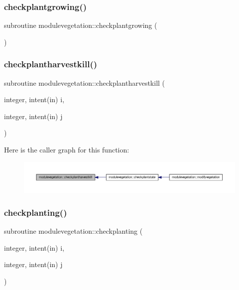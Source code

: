 \subsubsection{\texorpdfstring{checkplantgrowing()}{checkplantgrowing()}}
{\footnotesize\ttfamily subroutine modulevegetation\+::checkplantgrowing (\begin{DoxyParamCaption}{ }\end{DoxyParamCaption})\hspace{0.3cm}{\ttfamily [private]}}

\mbox{\label{namespacemodulevegetation_a3456662ceedeb9f7d5ad12c24dd83bc4}} 
\subsubsection{\texorpdfstring{checkplantharvestkill()}{checkplantharvestkill()}}
{\footnotesize\ttfamily subroutine modulevegetation\+::checkplantharvestkill (\begin{DoxyParamCaption}\item[{integer, intent(in)}]{i,  }\item[{integer, intent(in)}]{j }\end{DoxyParamCaption})\hspace{0.3cm}{\ttfamily [private]}}

Here is the caller graph for this function\+:\nopagebreak
\begin{figure}[H]
\begin{center}
\leavevmode
\includegraphics[width=350pt]{namespacemodulevegetation_a3456662ceedeb9f7d5ad12c24dd83bc4_icgraph}
\end{center}
\end{figure}
\mbox{\label{namespacemodulevegetation_a51a465c0efb7efd6bb8d99cabfc0c19e}} 
\subsubsection{\texorpdfstring{checkplanting()}{checkplanting()}}
{\footnotesize\ttfamily subroutine modulevegetation\+::checkplanting (\begin{DoxyParamCaption}\item[{integer, intent(in)}]{i,  }\item[{integer, intent(in)}]{j }\end{DoxyParamCaption})\hspace{0.3cm}{\ttfamily [private]}}

